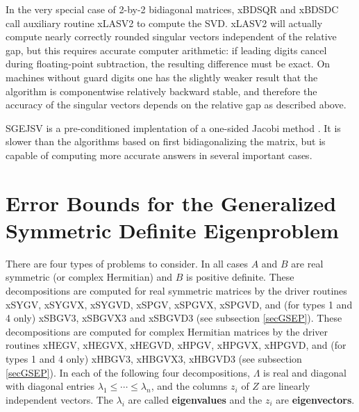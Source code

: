 In the very special case of 2-by-2 bidiagonal matrices, xBDSQR and xBDSDC
call auxiliary routine xLASV2 to compute the SVD. xLASV2 will
actually compute nearly correctly rounded singular vectors independent of
the relative gap, but this requires accurate computer arithmetic:
if leading digits cancel during floating-point subtraction, the resulting
difference must be exact.
On machines without guard digits one has the slightly weaker result that the
algorithm is componentwise relatively backward stable, and therefore the
accuracy  of the singular vectors depends on the relative gap as described
above.

SGEJSV is a pre-conditioned implentation of a one-sided Jacobi method 
\cite{Demmelveselic,veselicslapnicar,slapnicar1,drmacveselic1,drmacveselic2}.
It is slower than the algorithms based on first bidiagonalizing the matrix,
but is capable of computing more accurate answers in several important cases.

\section{Error Bounds for the Generalized Symmetric Definite
Eigenproblem}\label{secgendef}

There are four types of problems to consider.
In all cases $A$ and $B$
are real symmetric (or complex Hermitian) and $B$ is positive definite.
These decompositions are computed for real symmetric matrices
by the driver routines
xSYGV, xSYGVX, xSYGVD,
xSPGV, xSPGVX, xSPGVD,
and (for types 1 and 4 only)
xSBGV3, xSBGVX3 and xSBGVD3
(see subsection \ref{secGSEP}).
These decompositions are computed for complex Hermitian matrices
by the driver routines
xHEGV, xHEGVX, xHEGVD,
xHPGV, xHPGVX, xHPGVD,
and (for types 1 and 4 only)
xHBGV3, xHBGVX3, xHBGVD3
(see subsection \ref{secGSEP}).
In each of the following four decompositions,
$\Lambda$ is real and diagonal with diagonal entries
$\lambda_1 \leq \cdots \leq \lambda_n$, and
the columns $z_i$ of $Z$ are linearly independent vectors.
The $\lambda_i$ are called
{\bf eigenvalues} and the $z_i$ are
{\bf eigenvectors}.

